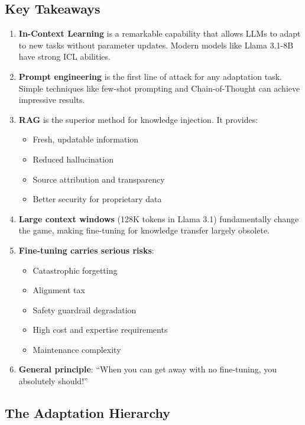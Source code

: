 \documentclass{article}
\begin{document}
\subsection{Key Takeaways}

\begin{enumerate}
\item \textbf{In-Context Learning} is a remarkable capability that allows LLMs to adapt to new tasks without parameter updates. Modern models like Llama 3.1-8B have strong ICL abilities.

\item \textbf{Prompt engineering} is the first line of attack for any adaptation task. Simple techniques like few-shot prompting and Chain-of-Thought can achieve impressive results.

\item \textbf{RAG} is the superior method for knowledge injection. It provides:
\begin{itemize}
\item Fresh, updatable information
\item Reduced hallucination
\item Source attribution and transparency
\item Better security for proprietary data
\end{itemize}

\item \textbf{Large context windows} (128K tokens in Llama 3.1) fundamentally change the game, making fine-tuning for knowledge transfer largely obsolete.

\item \textbf{Fine-tuning carries serious risks}:
\begin{itemize}
\item Catastrophic forgetting
\item Alignment tax
\item Safety guardrail degradation
\item High cost and expertise requirements
\item Maintenance complexity
\end{itemize}

\item \textbf{General principle}: ``When you can get away with no fine-tuning, you absolutely should!''
\end{enumerate}

\subsection{The Adaptation Hierarchy}
\end{document}
